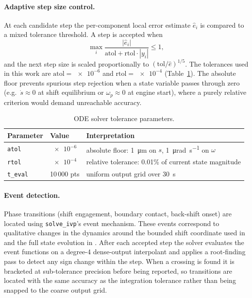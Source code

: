 \documentclass[11pt]{article}
\numberwithin{equation}{section}
\begin{document}
\paragraph{Adaptive step size control.}

At each candidate step the per-component local error estimate $\hat{e}_i$
is compared to a mixed tolerance threshold. A step is accepted when
\begin{equation}
\max_i \frac{|\hat{e}_i|}{\mathrm{atol} + \mathrm{rtol}\cdot|y_i|}
\le 1,
\end{equation}
and the next step size is scaled proportionally to $(\mathrm{tol}/\hat{e})^{1/5}$.
The tolerances used in this work are $\mathrm{atol} = \num{e-6}$ and
$\mathrm{rtol} = \num{e-4}$ (Table~\ref{tab:solver_tols}).
The absolute floor prevents spurious step rejection when a state variable
passes through zero (e.g.\ $\dot{s} \approx 0$ at shift equilibrium or
$\omega_p \approx 0$ at engine start), where a purely relative criterion
would demand unreachable accuracy.

\begin{table}[H]
\centering
\begin{tabular}{llp{7cm}}
\toprule
\textbf{Parameter} & \textbf{Value} & \textbf{Interpretation} \\
\midrule
\texttt{atol} & $\num{e-6}$ & absolute floor: \SI{1}{\micro\metre} on $s$,
                               \SI{1}{\micro\radian\per\second} on $\omega$ \\
\texttt{rtol} & $\num{e-4}$ & relative tolerance: 0.01\% of current state magnitude \\
\texttt{t\_eval} & 10\,000 pts & uniform output grid over \SI{30}{\second} \\
\bottomrule
\end{tabular}
\caption{ODE solver tolerance parameters.}
\label{tab:solver_tols}
\end{table}

\paragraph{Event detection.}

Phase transitions (shift engagement, boundary contact, back-shift onset) are
located using \texttt{solve\_ivp}'s event mechanism. These events correspond to
qualitative changes in the dynamics around the bounded shift coordinate used in
 and the full state evolution in
. After each accepted step
the solver evaluates the event functions on a degree-4 dense-output
interpolant and applies a root-finding pass to detect any sign change within
the step. When a crossing is found it is bracketed at sub-tolerance precision
before being reported, so transitions are located with the same accuracy as
the integration tolerance rather than being snapped to the coarse output grid.
\end{document}
